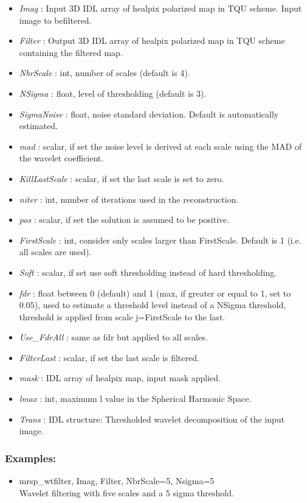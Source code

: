 \begin{itemize}
\item {\em Imag} : Input 3D IDL array of healpix polarized map in TQU scheme. Input image to befiltered.
\item {\em Filter} : Output 3D IDL array of healpix polarized map in TQU scheme containing the filtered map.
\item {\em NbrScale} : int, number of scales (default is 4).
\item {\em NSigma} : float, level of thresholding (default is 3).
\item {\em SigmaNoise} : float, noise standard deviation. Default is automatically estimated.
\item {\em mad} : scalar, if set the noise level is derived at each scale using the MAD of the wavelet coefficient.
\item {\em KillLastScale} : scalar, if set the last scale is set to zero.
\item {\em niter} : int, number of iterations used in the reconstruction.
\item {\em pos} : scalar, if set the solution is assumed to be positive.
\item {\em FirstScale} : int, consider only scales larger than FirstScale. Default is 1 (i.e. all scales are used).
\item {\em Soft} : scalar, if set use soft thresholding instead of hard thresholding.
\item {\em fdr} : float between 0 (default) and 1 (max, if greater or equal to 1, set to 0.05), used to estimate a threshold level 
instead of a NSigma threshold, threshold is applied from scale j=FirstScale to the last.
\item {\em Use\_FdrAll} : same as fdr but applied to all scales.
\item {\em FilterLast} : scalar, if set the last scale is filtered.
\item {\em mask} : IDL array of healpix map, input mask applied.
\item {\em lmax} : int, maximum l value in the Spherical Harmonic Space.
\item {\em Trans} : IDL structure: Thresholded wavelet decomposition of the input image.
\end{itemize}

\subsubsection*{Examples:} 
\begin{itemize}
\item mrsp\_wtfilter, Imag, Filter, NbrScale=5, Nsigma=5 \\
Wavelet filtering with five scales and a 5 sigma threshold.
\end{itemize}



